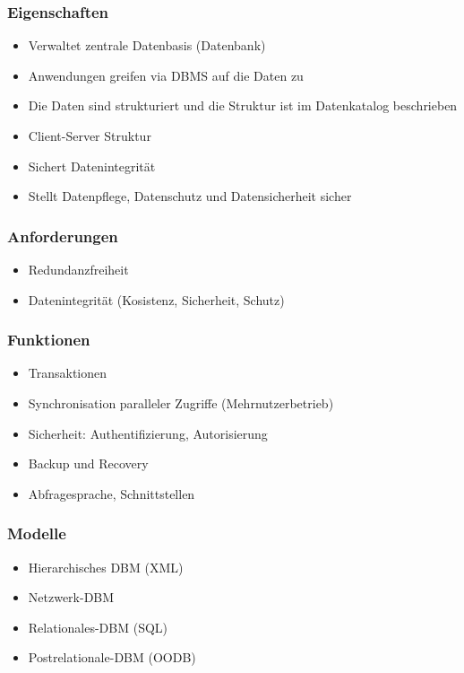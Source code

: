     \begin{multicols}{2}
        \subsubsection{Eigenschaften}
            \begin{itemize}
            \setlength{\itemsep}{0pt}
              \item Verwaltet zentrale Datenbasis (Datenbank)
              \item Anwendungen greifen via DBMS auf die Daten zu
              \item Die Daten sind strukturiert und die Struktur ist im Datenkatalog beschrieben
              \item Client-Server Struktur
              \item Sichert Datenintegrität
              \item Stellt Datenpflege, Datenschutz und Datensicherheit sicher
            \end{itemize}
        \subsubsection{Anforderungen}
           \begin{itemize}
           \setlength{\itemsep}{0pt}
             \item Redundanzfreiheit
             \item Datenintegrität (Kosistenz, Sicherheit, Schutz)
           \end{itemize}
        \subsubsection{Funktionen}
            \begin{itemize}
            \setlength{\itemsep}{0pt}  
              \item Transaktionen
              \item Synchronisation paralleler Zugriffe (Mehrnutzerbetrieb)
              \item Sicherheit: Authentifizierung, Autorisierung
              \item Backup und Recovery
              \item Abfragesprache, Schnittstellen
            \end{itemize}
        \subsubsection{Modelle}
            \begin{itemize}
            \setlength{\itemsep}{0pt}    
                \item Hierarchisches DBM (XML)
                \item Netzwerk-DBM
                \item Relationales-DBM (SQL)
                \item Postrelationale-DBM (OODB)
            \end{itemize}
    \end{multicols}            

